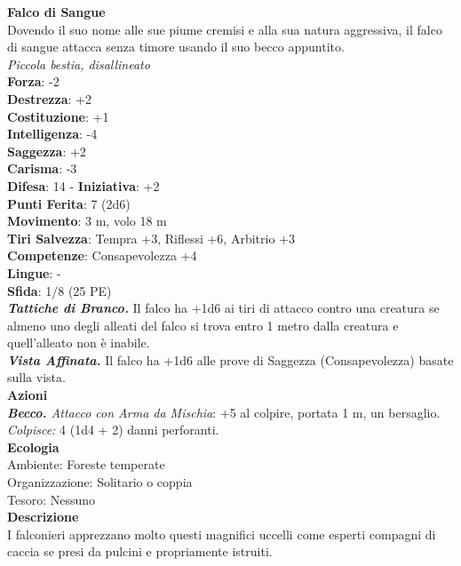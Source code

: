 \begin{multicols}{2}
\medskip\textbf{Falco di Sangue}\\
Dovendo il suo nome alle sue piume cremisi e alla sua natura aggressiva, il falco di sangue attacca senza timore usando il suo becco appuntito.\\
\emph{Piccola bestia, disallineato}\\
\textbf{Forza}: -2\\
\textbf{Destrezza}: +2\\
\textbf{Costituzione}: +1\\
\textbf{Intelligenza}: -4\\
\textbf{Saggezza}: +2\\
\textbf{Carisma}: -3\\
\textbf{Difesa}: 14 - \textbf{Iniziativa}: +2\\
\textbf{Punti Ferita}: 7 (2d6)\\
\textbf{Movimento}: 3 m, volo 18 m\\
\textbf{Tiri Salvezza}: Tempra +3, Riflessi +6, Arbitrio +3 \\
\textbf{Competenze}: Consapevolezza +4\\
\textbf{Lingue}: -\\
\textbf{Sfida}: 1/8 (25 PE)\smallskip\\
\emph{\textbf{Tattiche di Branco.}} Il falco ha +1d6 ai tiri di attacco contro una creatura se almeno uno degli alleati del falco si trova entro 1 metro dalla creatura e quell'alleato non è inabile.\\
\emph{\textbf{Vista Affinata.}} Il falco ha +1d6 alle prove di Saggezza (Consapevolezza) basate sulla vista.\\
\smallskip\textbf{Azioni}\\
\emph{\textbf{Becco.} Attacco con Arma da Mischia}: +5 al colpire, portata 1 m, un bersaglio.\\
\emph{Colpisce:} 4 (1d4 + 2) danni perforanti.\\
\textbf{Ecologia}\\
Ambiente: Foreste temperate\\
Organizzazione: Solitario o coppia\\
Tesoro: Nessuno\\
\textbf{Descrizione}\\
I falconieri apprezzano molto questi magnifici uccelli come esperti compagni di caccia se presi da pulcini e propriamente istruiti. \\



\end{multicols}
